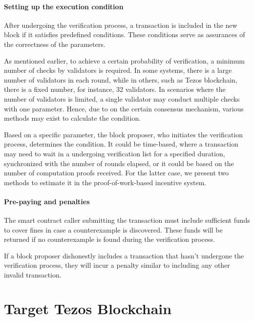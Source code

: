 \documentclass[runningheads]{llncs}
\begin{document}
\paragraph{Setting up the execution condition}  After undergoing the verification process, a transaction is included in the new block if it satisfies predefined conditions. These conditions serve as assurances of the correctness of the parameters. 

As mentioned earlier, to achieve a certain probability of verification, a minimum number of checks by validators is required. In some systems, there is a large number of validators in each round, while in others, such as Tezos blockchain, there is a fixed number, for instance, 32 validators. In scenarios where the number of validators is limited, a single validator may conduct multiple checks with one parameter. Hence, due to on the certain consensus mechanism, various methods may exist to calculate the condition.

Based on a specific parameter, the block proposer, who initiates the verification process, determines the condition. It could be time-based, where a transaction may need to wait in a undergoing verification list for a specified duration, synchronized with the number of rounds elapsed, or it could be based on the number of computation proofs received. For the latter case, we present two methods to estimate it in the proof-of-work-based incentive system.
\paragraph{Pre-paying and penalties} The smart contract caller submitting the transaction must include sufficient funds to cover fines in case a counterexample is discovered. These funds will be returned if no counterexample is found during the verification process.

If a block proposer dishonestly includes a transaction that hasn't undergone the verification process, they will incur a penalty similar to including any other invalid transaction.

\section{Target Tezos Blockchain}
\label{sec:tezos}
\end{document}

